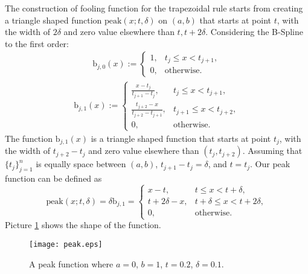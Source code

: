 \documentclass{iitthesis}
\theoremstyle{definition}
\theoremstyle{remark}
\begin{document}
The construction of fooling function for the trapezoidal rule starts from creating a triangle shaped function $\text{peak}(x;t,\delta)$ on $(a,b)$ that starts at point $t$, with the width of $2\delta$ and zero value elsewhere than $t, t+2\delta$. Considering the B-Spline to the first order:
\begin{align*}
  \text{b}_{j,0}(x):= \begin{cases} \displaystyle 1, & t_{j} \le x < t_{j+1},\\[1ex]
\displaystyle  0, & \text{otherwise}.
\end{cases}
\end{align*}
\begin{align*}
  \text{b}_{j,1}(x):= \begin{cases} \displaystyle \frac{x-t_{j}}{t_{j+1}-t_{j}}, & t_{j} \le x < t_{j+1},\\[1ex]
\displaystyle \frac{t_{j+2}-x}{t_{j+2}-t_{j+1}}, & t_{j+1} \le x < t_{j+2},\\[1ex]
\displaystyle  0, & \text{otherwise}.
\end{cases}
\end{align*}
The function $\text{b}_{j,1}(x)$ is a triangle shaped function that starts at point $t_j$, with the width of $t_{j+2}-t_{j}$ and zero value elsewhere than $(t_{j}, t_{j+2})$. Assuming that $\{t_{j}\}_{j=1}^{n}$ is equally space between $(a,b)$, $t_{j+1}-t_{j}=\delta$, and $t=t_{j}$. Our peak function can be defined as
\begin{equation}\label{peakfunction}
  \text{peak}(x;t,\delta)=\delta \text{b}_{j,1}=\begin{cases} \displaystyle x-t, & t \le x < t+\delta,\\[1ex]
\displaystyle t+2\delta-x, & t+\delta \le x < t+2\delta,\\[1ex]
\displaystyle  0, & \text{otherwise}.
\end{cases}
\end{equation}
Picture \ref{fig:peakfunction} shows the shape of the function.
\begin{figure}[ht]
\centering
\texttt{[image: peak.eps]}
\caption{A peak function where $a=0$, $b=1$, $t=0.2$, $\delta=0.1$. \label{fig:peakfunction}}
\end{figure}
\end{document}
